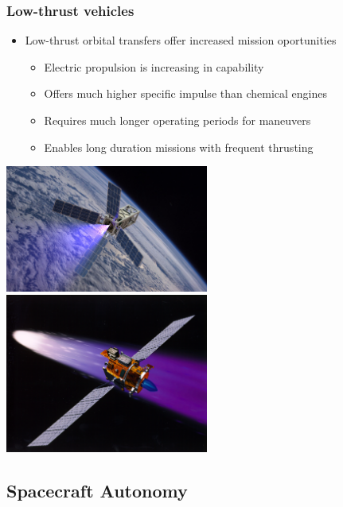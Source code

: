 \begin{frame} \label{slide:lowthrust_vehicles}%
\frametitle{Low-thrust vehicles} %
\begin{itemize}
    \item Low-thrust orbital transfers offer increased mission oportunities
    \begin{itemize}
        \item Electric propulsion is increasing in capability
        \item Offers much higher specific impulse than chemical engines 
        \item Requires much longer operating periods for maneuvers 
        \item Enables long duration missions with frequent thrusting
    \end{itemize}
\end{itemize}

\begin{center}
    \includegraphics[height=0.4\textheight,width=0.5\textwidth,keepaspectratio]{figures/defense/patriot_plume.jpg}
    ~
    \includegraphics[height=0.4\textheight,width=0.5\textwidth,keepaspectratio]{figures/defense/deepspace1.jpg}
\end{center}
\hyperlink{slide:propulsion}{}
\end{frame}   %

\subsection[Spacecraft Autonomy]{Spacecraft Autonomy}

